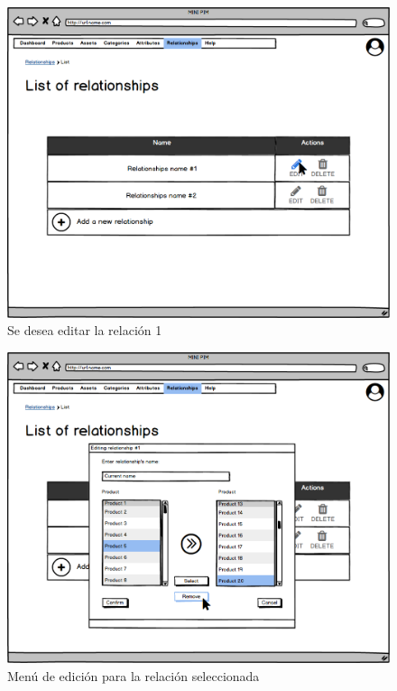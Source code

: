 \newpage %

\begin{figure}[H]
    \includegraphics[width=1\linewidth]{assets/mockups/RF5.3_1.png}
    \caption{Se desea editar la relación 1}
   \end{figure}
\vspace{1.0cm}

\begin{figure}[H]
    \includegraphics[width=1\linewidth]{assets/mockups/RF5.3_2.png}
    \caption{Menú de edición para la relación seleccionada}
   \end{figure}
\vspace{1.0cm}

